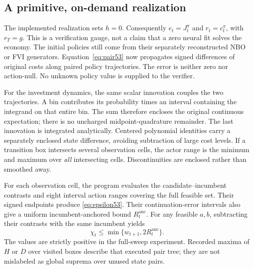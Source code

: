 \subsection{A primitive, on-demand realization}
The implemented realization sets $h=0$. Consequently $e_t=J_t^\pi$ and $r_t=c_t^\pi$, with $r_T=g$. This is a verification gauge, not a claim that a zero neural fit solves the economy. The initial policies still come from their separately reconstructed NBO or FVI generators. Equation~\eqref{eq:pair53} now propagates signed differences of original costs along paired policy trajectories. The error is neither zero nor action-null. No unknown policy value is supplied to the verifier.

For the investment dynamics, the same scalar innovation couples the two trajectories. A bin contributes its probability times an interval containing the integrand on that entire bin. The sum therefore encloses the original continuous expectation; there is no uncharged midpoint-quadrature remainder. The last innovation is integrated analytically. Centered polynomial identities carry a separately enclosed state difference, avoiding subtraction of large cost levels. If a transition box intersects several observation cells, the actor range is the minimum and maximum over \emph{all} intersecting cells. Discontinuities are enclosed rather than smoothed away.

For each observation cell, the program evaluates the candidate--incumbent contrasts and eight interval action ranges covering the full feasible set. Their signed endpoints produce \eqref{eq:epsilon53}. Their continuation-error intervals also give a uniform incumbent-anchored bound $R_t^{\mathrm{anc}}$. For any feasible $a,b$, subtracting their contrasts with the same incumbent yields
\begin{equation}\label{eq:chi53}
 \chi_t\le\min\{w_{t+1},2R_t^{\mathrm{anc}}\}.
\end{equation}
The values are strictly positive in the full-sweep experiment. Recorded maxima of $H$ or $D$ over visited boxes describe that executed pair tree; they are not mislabeled as global suprema over unused state pairs.

